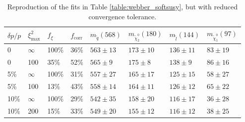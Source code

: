 \documentclass[twoside,english]{uiofysmaster}
\begin{document}
\begin{table}[hbt]
	\centering
	\begin{tabular}{| l | l | l | l  || l | l | l | l |}
		\hline
		$\delta p/p$ & $\xi^2_\mathrm{max}$ & $f_\xi$ & $f_\mathrm{corr}$ & $m_{\tilde q} (568)$ & $m_{\tilde \chi_2^0} (180)$ & $m_{\tilde l} (144)$ & $m_{\tilde \chi_1^0} (97)$ \\
		\hline \hline
		0 & 	$\infty$ &	100\%	& 36\%	& $563 \pm 13$	&	$173 \pm 10$	&	$136 \pm 11$	& 	$83 \pm 19$	\\
		0 &		100 &		35\%	& 52\% & $565 \pm 9$	&	$175 \pm 8$		&	$138 \pm 9$	&	$86 \pm 16$	\\
		5\% &	$\infty$ &	100\%	& 31\% & $557 \pm 27$	& 	$165 \pm 17$	&	$125 \pm 15$&	$58 \pm 27$ \\
		5\% &	100 &		13\%	& 43\% & $558 \pm 14$	&	$164 \pm 11$	& 	$126 \pm 12$	&	$65 \pm 22$	\\
		10\% &	$\infty$ &	100\%	& 29\% & $542 \pm 35$	&	$158 \pm 20$	&	$116 \pm 17$&	$36 \pm 28$	\\
		10\% &	200 &		15\%	& 33\% & $549 \pm 20$	& 	$155 \pm 12$	&	$116 \pm 12$&	$38 \pm 25$ \\
		\hline
	\end{tabular}
	\caption{Reproduction of the fits in Table \ref{table:webber_softsusy}, but with reduced convergence tolerance.}
	\label{table:webber_rec_lowtol}
\end{table}
\end{document}
